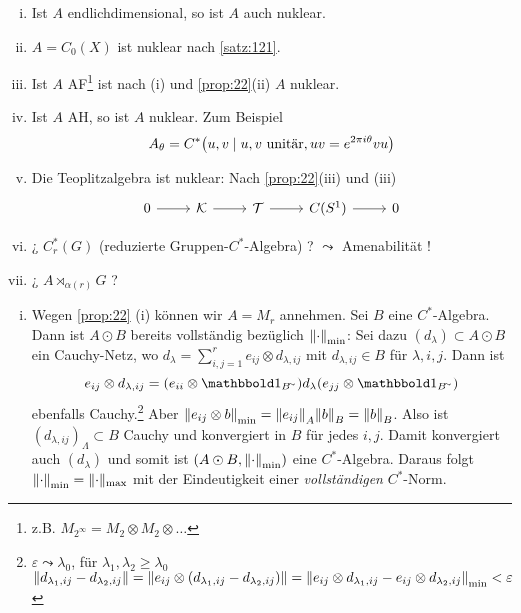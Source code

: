 \begin{beispiel}
	\begin{enumerate}[(i)]
		\item Ist $A$ endlichdimensional, so ist $A$ auch nuklear.
		\item $A=C_0(X)$ ist nuklear nach \autoref{satz:121}.
		\item Ist $A$ AF\footnote{z.B. $M_{2^\infty} = M_2 \otimes M_2 \otimes \ldots$} ist nach (i) und \autoref{prop:22}(ii) $A$ nuklear.
		\item Ist $A$ AH, so ist $A$ nuklear. Zum Beispiel
		\[
			A_\theta = C^* \enbrace*{u,v \mid u,v \text{ unitär}, uv=e^{2 \pi i \theta}vu}
		\]
		\item Die Teoplitzalgebra ist nuklear: Nach \autoref{prop:22}(iii) und (iii)
		\[
			\begin{tikzcd}
				0 \rar & \mathcal{K} \rar & \mathcal{T} \rar & C(S^1) \rar & 0
			\end{tikzcd}
		\]
		\item {\large¿} $C_r^*(G)$ (reduzierte Gruppen-$C^*$-Algebra) {\large?} \quad $\leadsto$  Amenabilität {\large!}
		\item {\large¿} $A \rtimes_{\alpha(r)} G$ {\large?}
	\end{enumerate}
\end{beispiel}
\begin{beweis}
	\begin{enumerate}[(i)]
		\item Wegen \autoref{prop:22} (i) können wir $A=M_r$ annehmen.
		Sei $B$ eine $C^*$-Algebra.
		Dann ist $A \odot B$ bereits vollständig bezüglich $\norm*{\cdot}_{\min}$: 
		Sei dazu $(d_\lambda) \subset A \odot B$ ein Cauchy-Netz, wo $d_\lambda = \sum_{i,j=1}^r e_{ij} \otimes d_{\lambda,ij}$ mit $d_{\lambda,ij} \in B$ für $\lambda, i,j$.
		Dann ist
		\[
			e_{ij} \otimes d_{\lambda,ij} = \enbrace*{e_{ii} \otimes \ind_{B^\simm}} d_\lambda \enbrace*{e_{jj} \otimes \ind_{B^\simm}}
		\]
		ebenfalls Cauchy.\footnote{$\varepsilon \leadsto \lambda_0$, für $\lambda_1, \lambda_2 \ge \lambda_0$  $\norm*{d_{\lambda_1,ij} - d_{\lambda_2,ij}} = \norm*{e_{ij} \otimes \enbrace*{d_{\lambda_1,ij}- d_{\lambda_2, ij}}} = \norm*{e_{ij} \otimes d_{\lambda_1,ij}- e_{ij} \otimes d_{\lambda_2, ij}}_{\min} < \varepsilon$}
		Aber $\norm*{e_{ij} \otimes b}_{\min} = \norm*{e_{ij}}_A \norm*{b}_B = \norm*{b}_B$.
		Also ist $(d_{\lambda,ij})_{\Lambda} \subset B$ Cauchy und konvergiert in $B$ für jedes $i,j$.
		Damit konvergiert auch $(d_\lambda)$ und somit ist $\enbrace*{A \odot B, \norm*{\cdot}_{\min}}$ eine $C^*$-Algebra.
		Daraus folgt $\norm*{\cdot}_{\min}=\norm{\cdot}_{\max}$ mit der Eindeutigkeit einer \emph{vollständigen} $C^*$-Norm.\qedhere
	\end{enumerate}
\end{beweis}

